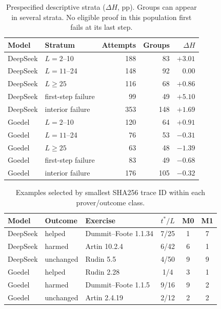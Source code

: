 \begin{table}[h]
\caption{Prespecified descriptive strata ($\Delta H$, pp). Groups can appear in several strata. No eligible proof in this population first fails at its last step.}
\label{tab:strata}
\begin{center}
\small
\begin{tabular}{llrrr}
\toprule
Model & Stratum & Attempts & Groups & $\Delta H$\\
\midrule
DeepSeek & $L=2$--10 & 188 & 83 & $+3.01$\\
DeepSeek & $L=11$--24 & 148 & 92 & 0.00\\
DeepSeek & $L\ge25$ & 116 & 68 & $+0.86$\\
DeepSeek & first-step failure & 99 & 49 & $+5.10$\\
DeepSeek & interior failure & 353 & 148 & $+1.69$\\
Goedel & $L=2$--10 & 120 & 64 & $+0.91$\\
Goedel & $L=11$--24 & 76 & 53 & $-0.31$\\
Goedel & $L\ge25$ & 63 & 48 & $-1.39$\\
Goedel & first-step failure & 83 & 49 & $-0.68$\\
Goedel & interior failure & 176 & 105 & $-0.32$\\
\bottomrule
\end{tabular}
\end{center}
\end{table}

\begin{table}[h]
\caption{Examples selected by smallest SHA256 trace ID within each prover/outcome class.}
\label{tab:examples}
\begin{center}
\small
\begin{tabular}{lllccc}
\toprule
Model & Outcome & Exercise & $t^*/L$ & M0 & M1\\
\midrule
DeepSeek & helped & Dummit--Foote 1.1.34 & 7/25 & 1 & 7\\
DeepSeek & harmed & Artin 10.2.4 & 6/42 & 6 & 1\\
DeepSeek & unchanged & Rudin 5.5 & 4/50 & 9 & 9\\
Goedel & helped & Rudin 2.28 & 1/4 & 3 & 1\\
Goedel & harmed & Dummit--Foote 1.1.5 & 9/16 & 9 & 2\\
Goedel & unchanged & Artin 2.4.19 & 2/12 & 2 & 2\\
\bottomrule
\end{tabular}
\end{center}
\end{table}

